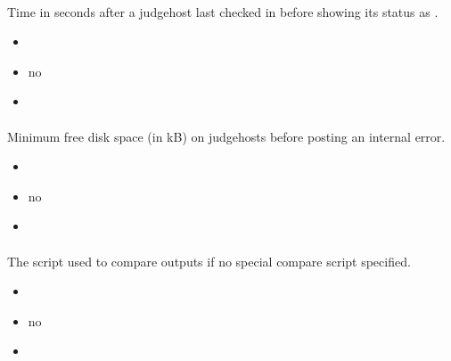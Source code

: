 \documentclass[a4paper,10pt,english,openany]{sphinxmanual}
\begin{document}
\paragraph{}
\label{\detokenize{configuration-reference:judgehost-critical}}
\sphinxAtStartPar
Time in seconds after a judgehost last checked in before showing its status as .
\begin{itemize}
\item {} 
\sphinxAtStartPar
{} 

\item {} 
\sphinxAtStartPar
{} no

\item {} 
\sphinxAtStartPar
{} 

\end{itemize}


\paragraph{}
\label{\detokenize{configuration-reference:diskspace-error}}
\sphinxAtStartPar
Minimum free disk space (in kB) on judgehosts before posting an internal error.
\begin{itemize}
\item {} 
\sphinxAtStartPar
{} 

\item {} 
\sphinxAtStartPar
{} no

\item {} 
\sphinxAtStartPar
{} 

\end{itemize}


\paragraph{}
\label{\detokenize{configuration-reference:default-compare}}
\sphinxAtStartPar
The script used to compare outputs if no special compare script specified.
\begin{itemize}
\item {} 
\sphinxAtStartPar
{} 

\item {} 
\sphinxAtStartPar
{} no

\item {} 
\sphinxAtStartPar
{} 

\end{itemize}
\end{document}
